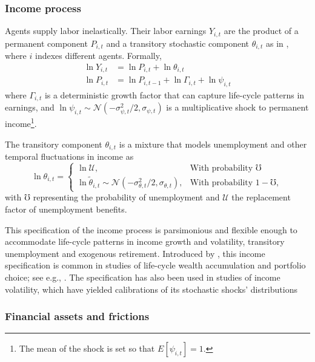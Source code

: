 \documentclass[./RiskyContrib.tex]{subfiles}
\begin{document}
\subsubsection{Income process}

Agents supply labor inelastically. Their labor earnings $Y_{i,t}$ are the product of a
permanent component $P_{i,t}$ and a transitory stochastic component $\theta_{i,t}$ as
in \cite{Carroll1997qje},  where $i$ indexes different agents. Formally,
\begin{equation*}
\begin{split}
\ln Y_{i,t} &= \ln P_{i,t} + \ln \theta_{i,t} \\
\ln P_{i,t} &= \ln P_{i,t-1} + \ln \Gamma_{i,t} + \ln \psi_{i,t}
\end{split}
\end{equation*}
where $\Gamma_{i,t}$ is a deterministic growth factor that can capture
life-cycle patterns in earnings, and
$\ln \psi_{i,t}\sim \mathcal{N}(-\sigma^2_{\psi,t}/2, \sigma_{\psi,t})$
is a multiplicative shock to permanent income\footnote{The mean of the shock is set so that $E[\psi_{i,t}] = 1$.}.

The transitory component $\theta_{i,t}$ is a mixture that models unemployment and
other temporal fluctuations in income as
\begin{equation*}
\ln\theta_{i,t} = \begin{cases}
\ln \mathcal{U}, & \text{With probability } \mho\\
\ln \tilde{\theta}_{i,t}\sim\mathcal{N}(-\sigma^2_{\theta,t}/2, \sigma_{\theta,t}), & \text{With probability } 1-\mho,
\end{cases}
\end{equation*}
with $\mho$ representing the probability of unemployment and $\mathcal{U}$ the replacement
factor of unemployment benefits.

This specification of the income process is parsimonious and flexible enough to accommodate
life-cycle patterns in income growth and volatility, transitory unemployment and exogenous
retirement. Introduced by \cite{Carroll1997qje}, this income specification is common in studies
of life-cycle wealth accumulation and portfolio choice; see e.g.,
\cite{Cagetti2003jbes,Cocco2005rfs,Fagereng2017jof}. The specification has
also been used in studies of income volatility, which have yielded calibrations of its stochastic
shocks' distributions \citep[see e.g.,][]{Carroll1992bpea,Carroll1997jme,Sabelhaus2010jme}

\subsubsection{Financial assets and frictions}\label{sec:fin_frictions}
\end{document}
